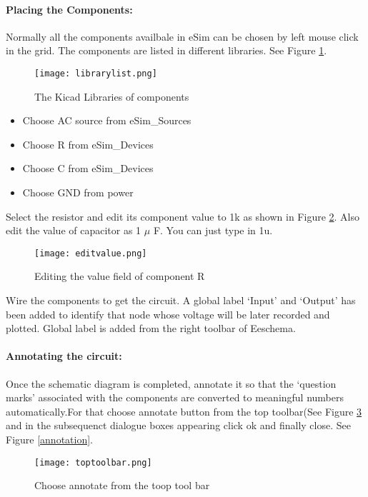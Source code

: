 \paragraph{Placing the Components:} Normally all the components availbale in eSim can be chosen by left mouse click in the grid. The components are listed in different libraries. See Figure \ref{librarylist}.

\begin{figure}[h]
\centering
\texttt{[image: librarylist.png]}
\caption{The Kicad Libraries of components}
\label{librarylist}
\end{figure}

\begin{itemize}
\item
Choose AC source from eSim\_Sources
\item
Choose R from eSim\_Devices
\item
Choose C from eSim\_Devices
\item
Choose GND from power
\end{itemize}

Select the resistor and edit its component value to 1k as shown in Figure \ref{editvalue}. Also edit the value of capacitor as 1 $\mu$ F. You can just type in 1u.

\begin{figure}[h]
\centering
\texttt{[image: editvalue.png]}
\caption{Editing the value field of component R}
\label{editvalue}
\end{figure}

Wire the components to get the circuit. A global label `Input'  and `Output' has been added to identify that node whose voltage will be later recorded and plotted. Global label is added from the right toolbar of Eeschema.

\paragraph{Annotating the circuit:} Once the schematic diagram is completed, annotate it so that the `question marks' associated with the components are converted to meaningful numbers automatically.For that choose annotate button from the top toolbar(See Figure \ref{toptoolbar} and in the subsequenct dialogue boxes appearing click ok and finally close. See Figure \ref{annotation}.

\begin{figure}[h]
\centering
\texttt{[image: toptoolbar.png]}
\caption{Choose annotate from the toop tool bar}
\label{toptoolbar}
\end{figure}



